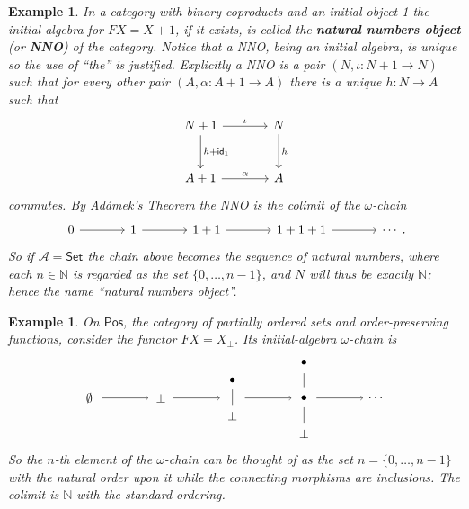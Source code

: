 \documentclass[letterpaper, 11pt, oneside]{memoir}
\theoremstyle{myteo}
\newtheorem{example}[theorem]{Example}
\numberwithin{equation}{section}
\newcommand{\marginnote}[1]{\marginpar{\footnotesize #1}}
\newcommand{\id}{\textsf{id}}
\newcommand{\Set}{\textsf{Set}}
\newcommand{\Pos}{\textsf{Pos}}
\newcommand{\N}{\mathbb{N}}
\newcommand{\A}{\mathscr{A}}
\begin{document}
\begin{example}
  In a category with binary coproducts and an initial object 1 the initial algebra for \(FX = X + 1\), if it exists, is called the \textbf{natural numbers object} (or \textbf{NNO}) \marginnote{natural numbers object} of the category.
  Notice that a NNO, being an initial algebra, is unique so the use of ``the'' is justified.
  Explicitly a NNO is a pair \((N, \iota:N+1 \to N)\) such that for every other pair \((A, \alpha : A+1 \to A)\) there is a unique \(h:N\to A\) such that
  \begin{equation*}
    \begin{tikzcd}[sep = large]
      N + 1 \ar[r, "\iota"] \ar[d, "h + \id_1"] & N \ar[d, "h"]\\
      A + 1 \ar[r, "\alpha"] & A
    \end{tikzcd}
  \end{equation*}
  commutes.
  By Adámek's Theorem the NNO is the colimit of the \(\omega\)-chain
  \begin{equation*}
    \begin{tikzcd}[sep = large]
      0 \ar[r] & 1 \ar[r] & 1 + 1 \ar[r] & 1 + 1 + 1 \ar[r] & \cdots
    \end{tikzcd}.
  \end{equation*}
  So if \(\A = \Set\) the chain above becomes the sequence of natural numbers, where each \(n \in \N\) is regarded as the set \(\{0, \ldots, n-1\}\), and \(N\) will thus be exactly \(\N\); hence the name ``natural numbers object''. 
\end{example}

\begin{example}
  On \(\Pos\), the category of partially ordered sets and order-preserving functions, consider the functor \(FX = X_\bot\).
  Its initial-algebra \(\omega\)-chain is
  \begin{equation*}
    \begin{tikzpicture}[every node/.style={outer sep=0.5cm}]
      \node (1) at (0, 0){\(\emptyset\)};
      \node (2) at (2, 0){\(\bot\)};
      \node (3) at (4, 0.5){\(\bullet\)};
      \node (4) at (4, -0.5){\(\bot\)};
      \node (5) at (6, 1){\(\bullet\)};
      \node (6) at (6, 0){\(\bullet\)};
      \node (7) at (6, -1){\(\bot\)};
      \node (8) at (8, 0){\(\cdots\)};
      \node (9) at (4, 0){};

      \draw[-] (3) -- (4);
      \draw[-] (5) -- (6) -- (7);

      \draw[->] (0.35, 0) to (1.65, 0);
      \draw[->] (2.35, 0) to (3.65, 0);
      \draw[->] (4.35, 0) to (5.65, 0);
      \draw[->] (6.35, 0) to (7.65, 0);
      
    \end{tikzpicture}
  \end{equation*}
  So the \(n\)-th element of the \(\omega\)-chain can be thought of as the set \(n = \{0, \ldots, n-1\}\) with the natural order upon it while the connecting morphisms are inclusions.
  The colimit is \(\N\) with the standard ordering.
\end{example}
\end{document}
